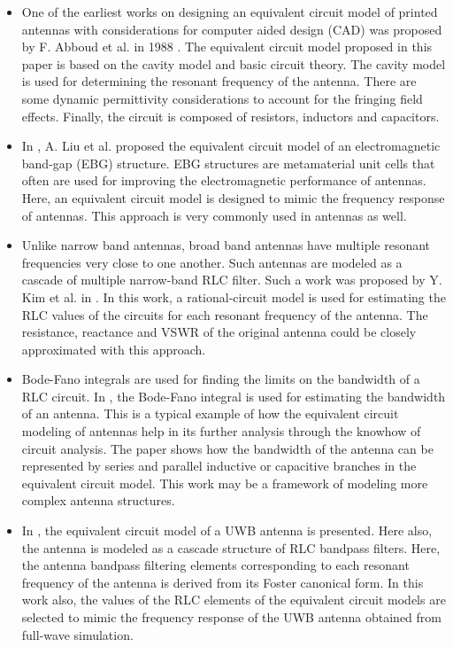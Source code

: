 \begin{itemize}
\item One of the earliest works on designing an equivalent circuit model of printed antennas with considerations for computer aided design (CAD) was proposed by F. Abboud et al. in 1988 \cite{RectEqCkt-der}. The equivalent circuit model proposed in this paper is based on the cavity model and basic circuit theory. The cavity model is used for determining the resonant frequency of the antenna. There are some dynamic permittivity considerations to account for the fringing field effects. Finally, the circuit is composed of resistors, inductors and capacitors.
\item In \cite{mtm_ebg_eqckt2}, A. Liu et al. proposed the equivalent circuit model of an electromagnetic band-gap (EBG) structure. EBG structures are metamaterial unit cells that often are used for improving the electromagnetic performance of antennas. Here, an equivalent circuit model is designed to mimic the frequency response of antennas. This approach is very commonly used in antennas as well.
\item Unlike narrow band antennas, broad band antennas have multiple resonant frequencies very close to one another. Such antennas are modeled as a cascade of multiple narrow-band RLC filter. Such a work was proposed by Y. Kim et al. in \cite{Broadband_EqCkt}. In this work, a rational-circuit model is used for estimating the RLC values of the circuits for each resonant frequency of the antenna. The resistance, reactance and VSWR of the original antenna could be closely approximated with this approach.
\item Bode-Fano integrals are used for finding the limits on the bandwidth of a RLC circuit. In \cite{Fano_BW_Antenna}, the Bode-Fano integral is used for estimating the bandwidth of an antenna. This is a typical example of how the equivalent circuit modeling of antennas help in its further analysis through the knowhow of circuit analysis. The paper shows how the bandwidth of the antenna can be represented by series and parallel inductive or capacitive branches in the equivalent circuit model. This work may be a framework of modeling more complex antenna structures.
\item In \cite{UwbEqCktMethod}, the equivalent circuit model of a UWB antenna is presented. Here also, the antenna is modeled as a cascade structure of RLC bandpass filters. Here, the antenna bandpass filtering elements corresponding to each resonant frequency of the antenna is derived from its Foster canonical form. In this work also, the values of the RLC elements of the equivalent circuit models are selected to mimic the frequency response of the UWB antenna obtained from full-wave simulation.

\end{itemize}
